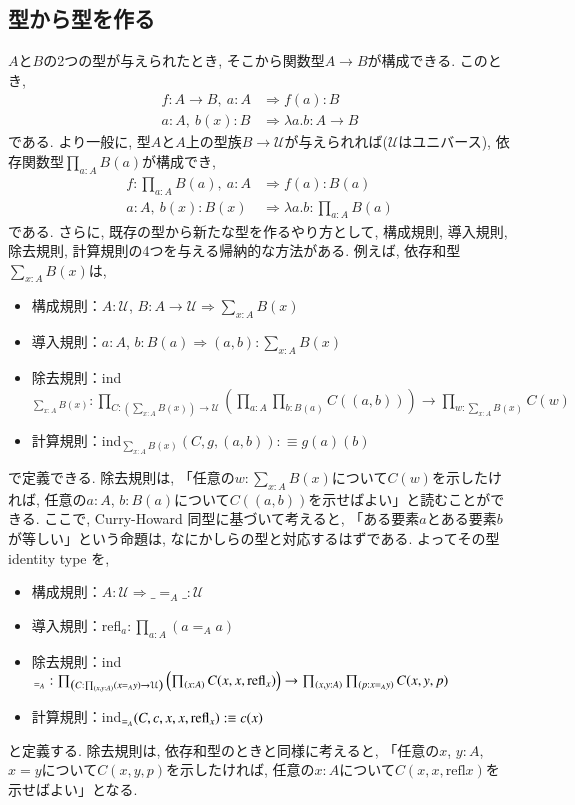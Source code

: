 \documentclass[11pt]{jarticle}
\theoremstyle{mystyle}
\newcommand{\U}{\mathcal{U}}
\newcommand{\Lra}{\Longrightarrow}
\newcommand{\refl}{\textrm{refl}}
\newcommand{\0}{\textbf{0}}
\newcommand{\1}{\textbf{1}}
\newcommand{\2}{\textbf{2}}
\begin{document}
\subsection{型から型を作る}
$A$と$B$の2つの型が与えられたとき, そこから関数型$A \to B$が構成できる. このとき, 
\begin{align*}
  f : A \to B,\ a : A &\Lra f(a) : B \\
  a : A,\ b(x) : B &\Lra \lambda a. b : A \to B 
\end{align*}
である. より一般に, 型$A$と$A$上の型族$B \to \U$が与えられれば($\U$はユニバース), 依存関数型$\prod_{a : A} B(a)$が構成でき, 
\begin{align*}
  f :\prod_{a : A} B(a),\ a : A &\Lra f(a) : B(a) \\
  a : A,\ b(x) : B(x) &\Lra \lambda a. b : \prod_{a : A} B(a) 
\end{align*}
である. さらに, 既存の型から新たな型を作るやり方として, 構成規則, 導入規則, 除去規則, 計算規則の4つを与える帰納的な方法がある. 例えば, 依存和型$\sum_{x : A} B(x)$は, 
\begin{itemize}
  \item 構成規則：$A : \U$, $B : A \to \U \Lra \sum_{x : A} B(x)$
  \item 導入規則：$a : A$, $b : B(a) \Lra (a, b) : \sum_{x : A} B(x)$
  \item 除去規則：ind$_{\sum_{x : A} B(x)} : \prod_{C : (\sum_{x : A} B(x)) \to \U} 
                               \left(\prod_{a : A} \prod_{b : B(a)} C((a, b)) \right) \to 
                                      \prod_{w : \sum_{x : A} B(x)} C(w)$
  \item 計算規則：ind$_{\sum_{x : A} B(x)} (C, g, (a, b)) :\equiv g(a)(b)$
\end{itemize}
で定義できる. 除去規則は, 「任意の$w : \sum_{x : A} B(x)$について$C(w)$を示したければ, 任意の$a : A$, $b : B(a)$について$C((a, b))$を示せばよい」と読むことができる. 
ここで, Curry-Howard 同型に基づいて考えると, 「ある要素$a$とある要素$b$が等しい」という命題は, なにかしらの型と対応するはずである. よってその型 identity type を, 
\begin{itemize}
  \item 構成規則：$A : \U \Lra \_ =_A \_ : \U$
  \item 導入規則：refl$_a : \prod_{a : A} (a =_A a)$
  \item 除去規則：ind$_{=_A} : \prod_{\left( C : \prod_{(x, y : A)} (x =_A y) \to \U \right)} 
                                       \left( \prod_{(x : A)} C(x, x, {\rm refl}_x) \right) \to
                                       \prod_{(x, y : A)} \prod_{(p : x =_A y)} C(x, y, p)$
  \item 計算規則：ind$_{=_A} (C, c, x, x, {\rm refl}_x) : \equiv c(x)$
\end{itemize}
と定義する. 除去規則は, 依存和型のときと同様に考えると, 「任意の$x$, $y : A$, $x = y$について$C(x, y, p)$を示したければ, 任意の$x : A$について$C(x, x, \refl{x})$を示せばよい」となる. 
\end{document}
